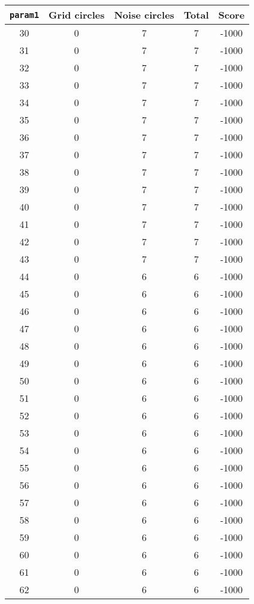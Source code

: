 \documentclass[letterpaper, 12pt]{article}
\begin{document}
\begin{longtable}{|c|c|c|c|c|}
\hline
\textbf{\texttt{param1}} & \textbf{Grid circles} & \textbf{Noise circles} & \textbf{Total} & \textbf{Score} \\
\hline
30 & 0 & 7 & 7 & -1000 \\
\hline
31 & 0 & 7 & 7 & -1000 \\
\hline
32 & 0 & 7 & 7 & -1000 \\
\hline
33 & 0 & 7 & 7 & -1000 \\
\hline
34 & 0 & 7 & 7 & -1000 \\
\hline
35 & 0 & 7 & 7 & -1000 \\
\hline
36 & 0 & 7 & 7 & -1000 \\
\hline
37 & 0 & 7 & 7 & -1000 \\
\hline
38 & 0 & 7 & 7 & -1000 \\
\hline
39 & 0 & 7 & 7 & -1000 \\
\hline
40 & 0 & 7 & 7 & -1000 \\
\hline
41 & 0 & 7 & 7 & -1000 \\
\hline
42 & 0 & 7 & 7 & -1000 \\
\hline
43 & 0 & 7 & 7 & -1000 \\
\hline
44 & 0 & 6 & 6 & -1000 \\
\hline
45 & 0 & 6 & 6 & -1000 \\
\hline
46 & 0 & 6 & 6 & -1000 \\
\hline
47 & 0 & 6 & 6 & -1000 \\
\hline
48 & 0 & 6 & 6 & -1000 \\
\hline
49 & 0 & 6 & 6 & -1000 \\
\hline
50 & 0 & 6 & 6 & -1000 \\
\hline
51 & 0 & 6 & 6 & -1000 \\
\hline
52 & 0 & 6 & 6 & -1000 \\
\hline
53 & 0 & 6 & 6 & -1000 \\
\hline
54 & 0 & 6 & 6 & -1000 \\
\hline
55 & 0 & 6 & 6 & -1000 \\
\hline
56 & 0 & 6 & 6 & -1000 \\
\hline
57 & 0 & 6 & 6 & -1000 \\
\hline
58 & 0 & 6 & 6 & -1000 \\
\hline
59 & 0 & 6 & 6 & -1000 \\
\hline
60 & 0 & 6 & 6 & -1000 \\
\hline
61 & 0 & 6 & 6 & -1000 \\
\hline
62 & 0 & 6 & 6 & -1000 \\

\end{longtable}
\end{document}
